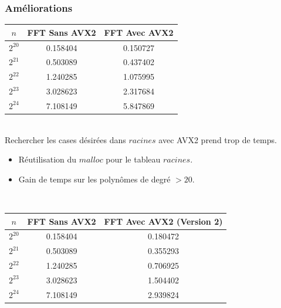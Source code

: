 \documentclass[8pt]{beamer}
\begin{document}
\begin{frame}
\frametitle{Améliorations}

\begin{center}
\begin{tabular}{||c c c||}
\hline
$n$ & FFT Sans AVX2 & FFT Avec AVX2 \\
\hline\hline
$2^{20}$ & 0.158404 & 0.150727 \\
\hline
$2^{21}$ & 0.503089 & 0.437402 \\
\hline
$2^{22}$ & 1.240285 & 1.075995 \\
\hline
$2^{23}$ & 3.028623 & 2.317684 \\
\hline
$2^{24}$ & 7.108149 & 5.847869 \\
\hline
\end{tabular}
\end{center}
\ \\[0.2cm]

Rechercher les cases désirées dans $racines$ avec AVX2 prend trop de temps.\\
\begin{itemize}
    \item Réutilisation du $malloc$ pour le tableau $racines$.\\[0.2cm]
    \item Gain de temps sur les polynômes de degré $> 20$.\\[0.2cm]
\end{itemize}
\ \\[0.2cm]

\begin{center}
\begin{tabular}{||c c c||}
\hline
$n$ & FFT Sans AVX2 & FFT Avec AVX2 (Version 2) \\
\hline\hline
$2^{20}$ & 0.158404 & 0.180472 \\
\hline
$2^{21}$ & 0.503089 & 0.355293 \\
\hline
$2^{22}$ & 1.240285 & 0.706925 \\
\hline
$2^{23}$ & 3.028623 & 1.504402 \\
\hline
$2^{24}$ & 7.108149 & 2.939824 \\
\hline
\end{tabular}
\end{center}


\end{frame}
\end{document}
